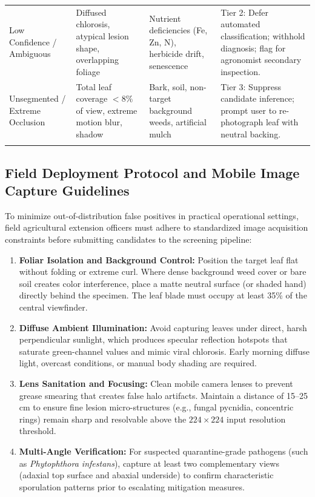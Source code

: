 \documentclass[pdflatex,sn-mathphys-num]{sn-jnl}
\theoremstyle{thmstyleone}%
\theoremstyle{thmstyletwo}%
\theoremstyle{thmstylethree}%
\begin{document}
\begin{appendices}
\begin{table}[htbp]
{\begin{tabular}{p{2.8cm}p{3.8cm}p{3.2cm}p{4.5cm}}
Low Confidence / Ambiguous & Diffused chlorosis, atypical lesion shape, overlapping foliage & Nutrient deficiencies (Fe, Zn, N), herbicide drift, senescence & Tier 2: Defer automated classification; withhold diagnosis; flag for agronomist secondary inspection. \\
Unsegmented / Extreme Occlusion & Total leaf coverage $< 8\%$ of view, extreme motion blur, shadow & Bark, soil, non-target background weeds, artificial mulch & Tier 3: Suppress candidate inference; prompt user to re-photograph leaf with neutral backing. \\
\botrule
\end{tabular}%
}
\end{table}

\subsection{Field Deployment Protocol and Mobile Image Capture Guidelines}
To minimize out-of-distribution false positives in practical operational settings, field agricultural extension officers must adhere to standardized image acquisition constraints before submitting candidates to the screening pipeline:
\begin{enumerate}
  \item \textbf{Foliar Isolation and Background Control:} Position the target leaf flat without folding or extreme curl. Where dense background weed cover or bare soil creates color interference, place a matte neutral surface (or shaded hand) directly behind the specimen. The leaf blade must occupy at least 35\% of the central viewfinder.
  \item \textbf{Diffuse Ambient Illumination:} Avoid capturing leaves under direct, harsh perpendicular sunlight, which produces specular reflection hotspots that saturate green-channel values and mimic viral chlorosis. Early morning diffuse light, overcast conditions, or manual body shading are required.
  \item \textbf{Lens Sanitation and Focusing:} Clean mobile camera lenses to prevent grease smearing that creates false halo artifacts. Maintain a distance of 15--25\,cm to ensure fine lesion micro-structures (e.g., fungal pycnidia, concentric rings) remain sharp and resolvable above the $224 \times 224$ input resolution threshold.
  \item \textbf{Multi-Angle Verification:} For suspected quarantine-grade pathogens (such as \textit{Phytophthora infestans}), capture at least two complementary views (adaxial top surface and abaxial underside) to confirm characteristic sporulation patterns prior to escalating mitigation measures.
\end{enumerate}

\end{appendices}



\end{document}
